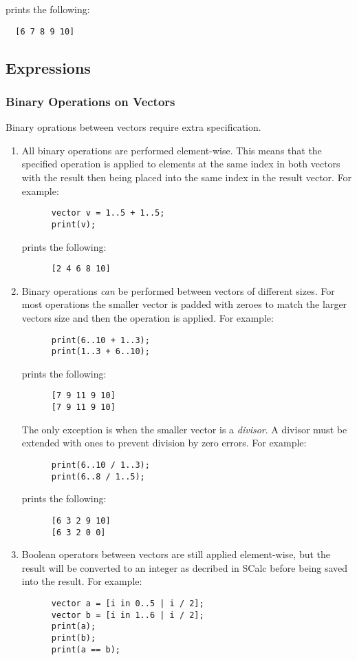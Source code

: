 \documentclass{article}
\begin{document}
prints the following:
\begin{lstlisting}
  [6 7 8 9 10]
\end{lstlisting}

\subsection{Expressions}
\subsubsection{Binary Operations on Vectors}
Binary oprations between vectors require extra specification.
\begin{enumerate}
  \item
    All binary operations are performed element-wise. This means that the specified operation is
    applied to elements at the same index in both vectors with the result then being placed into the
    same index in the result vector. For example:
    \begin{lstlisting}
      vector v = 1..5 + 1..5;
      print(v);
    \end{lstlisting}

    prints the following:
    \begin{lstlisting}
      [2 4 6 8 10]
    \end{lstlisting}
  \item
    Binary operations \textit{can} be performed between vectors of different sizes. For most
    operations the smaller vector is padded with zeroes to match the larger vectors size and then
    the operation is applied.
    For example:
    \begin{lstlisting}
      print(6..10 + 1..3);
      print(1..3 + 6..10);
    \end{lstlisting}

    prints the following:
    \begin{lstlisting}
      [7 9 11 9 10]
      [7 9 11 9 10]
    \end{lstlisting}

    The only exception is when the smaller vector is a \textit{divisor}. A divisor must be extended
    with ones to prevent division by zero errors. For example:
    \begin{lstlisting}
      print(6..10 / 1..3);
      print(6..8 / 1..5);
    \end{lstlisting}

    prints the following:
    \begin{lstlisting}
      [6 3 2 9 10]
      [6 3 2 0 0]
    \end{lstlisting}
  \item
    Boolean operators between vectors are still applied element-wise, but the result will be
    converted to an integer as decribed in SCalc before being saved into the result. For example:
    \begin{lstlisting}
      vector a = [i in 0..5 | i / 2];
      vector b = [i in 1..6 | i / 2];
      print(a);
      print(b);
      print(a == b);
    \end{lstlisting}


\end{enumerate}
\end{document}
